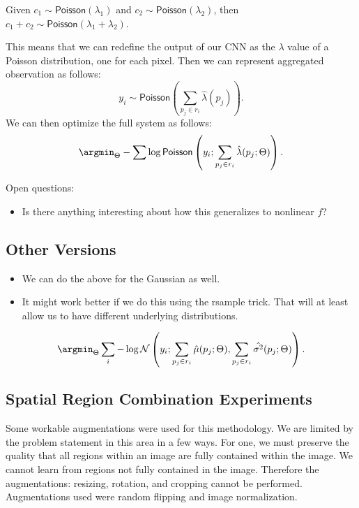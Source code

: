 Given $c_1 \sim \mathsf{Poisson}(\lambda_1)$ and 
 $c_2 \sim \mathsf{Poisson}(\lambda_2)$, then $c_1+c_2 \sim \mathsf{Poisson}(\lambda_1 + \lambda_2)$.

This means that we can redefine the output of our CNN as the $\lambda$ value of a Poisson distribution, one for each pixel.  Then we can represent aggregated observation as follows: 
\begin{equation}
    y_i \sim \mathsf{Poisson}(\sum_{p_j\in r_i}\hat{\lambda}\left( p_j\right)).
\end{equation}
We can then optimize the full system as follows:
\begin{equation}
    \argmin_\Theta - \sum \log 
    \mathsf{Poisson}\left(y_i; \sum_{p_j\in r_i}\hat{\lambda}( p_j; \Theta)\right).
\end{equation}




Open questions:
\begin{itemize}
    
    \item Is there anything interesting about how this generalizes to nonlinear $f$?
    
\end{itemize}




\subsection{Other Versions}

\begin{itemize}
    \item We can do the above for the Gaussian as well. 
    \item It might work better if we do this using the rsample trick. That will at least allow us to have different underlying distributions.
\end{itemize}

\begin{equation}
    \argmin_\Theta \sum_{i} -\log 
    \mathsf{\mathcal{N}}\left(y_i; \sum_{p_j\in r_i}\hat{\mu}( p_j; \Theta),\sum_{p_j\in r_i}\hat{\sigma^{2}}( p_j; \Theta)\right).
\end{equation}

\subsection{Spatial Region Combination Experiments}
Some workable augmentations were used for this methodology. We are limited by the problem statement in this area in a few ways. For one, we must preserve the quality that all regions within an image are fully contained within the image. We cannot learn from regions not fully contained in the image. Therefore the augmentations: resizing, rotation, and cropping cannot be performed. Augmentations used were random flipping and image normalization.
    
